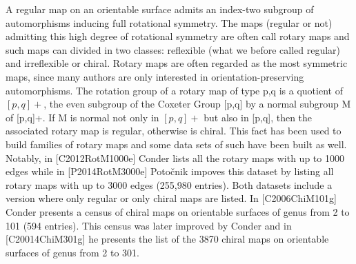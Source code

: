 A regular map on an orientable surface  admits an index-two subgroup of automorphisms inducing full rotational symmetry. The maps (regular or not) admitting this high degree of rotational symmetry are often call rotary maps and such maps can divided in two classes: reflexible (what we before called regular) and irreflexible or chiral. Rotary maps are often regarded as the most symmetric maps, since many authors are only interested in orientation-preserving automorphisms. The rotation group of a rotary map of type {p,q} is a quotient of$ [p,q]{+}$, the even subgroup of the Coxeter Group [p,q] by a normal subgroup M of [p,q]+. If M is normal not only in $[p,q]{+}$ but also in [p,q], then the associated rotary map is regular, otherwise is chiral.  This fact has been used to build families of rotary maps and some data sets of such have been built as well. Notably, in [C2012RotM1000e] Conder lists all the rotary maps with up to 1000 edges while in  [P2014RotM3000e] Potočnik impoves this dataset by listing all rotary maps with up to 3000 edges (255,980 entries). Both datasets include a version where only regular or only chiral maps are listed. In [C2006ChiM101g] Conder presents a census of  chiral  maps on orientable surfaces of genus from 2 to 101 (594 entries). This  census was later improved by Conder and in [C20014ChiM301g] he presents the list of the 3870 chiral maps on orientable surfaces of genus from 2 to 301.

